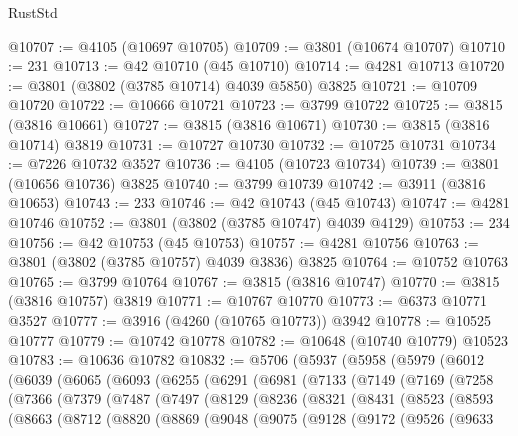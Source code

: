 \begin{lexlean}{RustStd}
\begin{coremodule}
@10707 := @4105 (@10697 @10705)
@10709 := @3801 (@10674 @10707)
@10710 := 231
@10713 := @42 @10710 (@45 @10710)
@10714 := @4281 @10713
@10720 := @3801 (@3802 (@3785 @10714) @4039 @5850) @3825
@10721 := @10709 @10720
@10722 := @10666 @10721
@10723 := @3799 @10722
@10725 := @3815 (@3816 @10661)
@10727 := @3815 (@3816 @10671)
@10730 := @3815 (@3816 @10714) @3819
@10731 := @10727 @10730
@10732 := @10725 @10731
@10734 := @7226 @10732 @3527
@10736 := @4105 (@10723 @10734)
@10739 := @3801 (@10656 @10736) @3825
@10740 := @3799 @10739
@10742 := @3911 (@3816 @10653)
@10743 := 233
@10746 := @42 @10743 (@45 @10743)
@10747 := @4281 @10746
@10752 := @3801 (@3802 (@3785 @10747) @4039 @4129)
@10753 := 234
@10756 := @42 @10753 (@45 @10753)
@10757 := @4281 @10756
@10763 := @3801 (@3802 (@3785 @10757) @4039 @3836) @3825
@10764 := @10752 @10763
@10765 := @3799 @10764
@10767 := @3815 (@3816 @10747)
@10770 := @3815 (@3816 @10757) @3819
@10771 := @10767 @10770
@10773 := @6373 @10771 @3527
@10777 := @3916 (@4260 (@10765 @10773)) @3942
@10778 := @10525 @10777
@10779 := @10742 @10778
@10782 := @10648 (@10740 @10779) @10523
@10783 := @10636 @10782
@10832 := @5706
    (@5937
      (@5958
        (@5979
          (@6012
            (@6039
              (@6065
                (@6093
                  (@6255
                    (@6291
                      (@6981
                        (@7133
                          (@7149
                            (@7169
                              (@7258
                                (@7366
                                  (@7379
                                    (@7487
                                      (@7497
                                        (@8129
                                          (@8236
                                            (@8321
                                              (@8431
                                                (@8523
                                                  (@8593
                                                    (@8663
                                                      (@8712
                                                        (@8820
                                                          (@8869
                                                            (@9048
                                                              (@9075
                                                                (@9128
                                                                  (@9172
                                                                    (@9526
                                                                      (@9633

\end{coremodule}
\end{lexlean}
